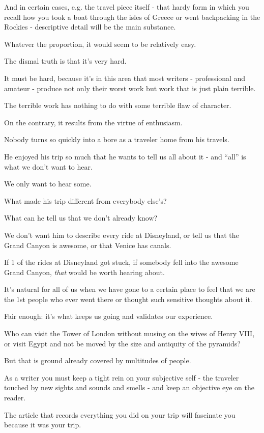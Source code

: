\documentclass{book}
\numberwithin{equation}{section}
\begin{document}
And in certain cases, e.g. the travel piece itself - that hardy form in which you recall how you took a boat through the isles of Greece or went backpacking in the Rockies - descriptive detail will be the main substance.

%
Whatever the proportion, it would seem to be relatively easy.

The dismal truth is that it's very hard.

It must be hard, because it's in this area that most writers - professional and amateur - produce not only their worst work but work that is just plain terrible.

The terrible work has nothing to do with some terrible flaw of character.

On the contrary, it results from the virtue of enthusiasm.

Nobody turns so quickly into a bore as a traveler home from his travels.

He enjoyed his trip so much that he wants to tell us all about it - and ``all'' is what we don't want to hear.

We only want to hear some.

What made his trip different from everybody else's?

What can he tell us that we don't already know?

We don't want him to describe every ride at Disneyland, or tell us that the Grand Canyon is awesome, or that Venice has canals.

If 1 of the rides at Disneyland got stuck, if somebody fell into the awesome Grand Canyon, \textit{that} would be worth hearing about.

It's natural for all of us when we have gone to a certain place to feel that we are the 1st people who ever went there or thought such sensitive thoughts about it.

Fair enough: it's what keeps us going and validates our experience.

Who can visit the Tower of London without musing on the wives of Henry VIII, or visit Egypt and not be moved by the size and antiquity of the pyramids?

But that is ground already covered by multitudes of people.

As a writer you must keep a tight rein on your subjective self - the traveler touched by new sights and sounds and smells - and keep an objective eye on the reader.

The article that records everything you did on your trip will fascinate you because it was your trip.
\end{document}
